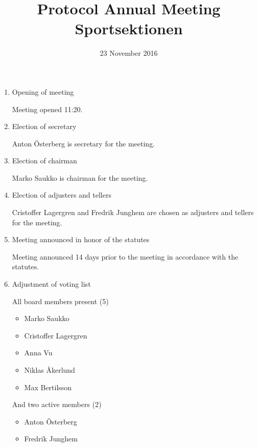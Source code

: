 \documentclass[12pt,a4paper]{article}
\begin{document}
	\title{\Huge Protocol Annual Meeting Sportsektionen}
	\date{23 November 2016}
	\maketitle

	\null
	\vfill

	\clearpage

	\begin{enumerate}

		\item Opening of meeting
		
			Meeting opened 11:20.
			
		\item Election of secretary
		
			Anton Österberg is secretary for the meeting.
			
		\item Election of chairman
		
			Marko Saukko is chairman for the meeting.
			
		\item Election of adjusters and tellers
		
			Cristoffer Lagergren and Fredrik Junghem are chosen as adjusters and tellers for the meeting.
			
		\item Meeting announced in honor of the statutes
		
			Meeting announced 14 days prior to the meeting in accordance with the statutes.
			
		\item Adjustment of voting list
		
			All board members present (5)
			\begin{itemize}
				\item Marko Saukko
				\item Cristoffer Lagergren
				\item Anna Vu
				\item Niklas Åkerlund
				\item Max Bertilsson
			\end{itemize}
				
			And two active members (2)
			\begin{itemize}
				\item Anton Österberg
				\item Fredrik Junghem
			\end{itemize}
				

\end{enumerate}
\end{document}
